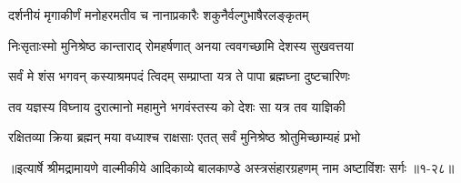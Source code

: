 \twolineshloka
{दर्शनीयं मृगाकीर्णं मनोहरमतीव च}
{नानाप्रकारैः शकुनैर्वल्गुभाषैरलङ्कृतम्} %

\twolineshloka
{निःसृताःस्मो मुनिश्रेष्ठ कान्ताराद् रोमहर्षणात्}
{अनया त्ववगच्छामि देशस्य सुखवत्तया} %

\twolineshloka
{सर्वं मे शंस भगवन् कस्याश्रमपदं त्विदम्}
{सम्प्राप्ता यत्र ते पापा ब्रह्मघ्ना दुष्टचारिणः} %

\twolineshloka
{तव यज्ञस्य विघ्नाय दुरात्मानो महामुने}
{भगवंस्तस्य को देशः सा यत्र तव याज्ञिकी} %

\twolineshloka
{रक्षितव्या क्रिया ब्रह्मन् मया वध्याश्च राक्षसाः}
{एतत् सर्वं मुनिश्रेष्ठ श्रोतुमिच्छाम्यहं प्रभो} %


॥इत्यार्षे श्रीमद्रामायणे वाल्मीकीये आदिकाव्ये बालकाण्डे अस्त्रसंहारग्रहणम् नाम अष्टाविंशः सर्गः ॥१-२८॥
